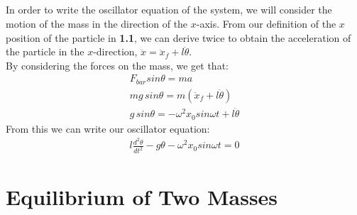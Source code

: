 \documentclass{article}
\begin{document}
\subsection{} %

In order to write the oscillator equation of the system, we will consider the motion of the mass in the direction of the $x$-axis. From our definition of the $x$ position of the particle in \textbf{1.1}, we can derive twice to obtain the acceleration of the particle in the $x$-direction, $\ddot{x} = \ddot{x}_f + l \ddot{\theta}$.\\

\noindent By considering the forces on the mass, we get that:
\begin{align*}
	F_{bar}sin\theta = ma\\
	mg\,sin\theta = m( \ddot{x}_f + l \ddot{\theta})\\
	g\,sin\theta = -\omega^2x_0sin \omega t + l \ddot{\theta}
\end{align*}
From this we can write our oscillator equation:
\begin{align*}
	l \frac{d^2 \theta}{dt^2} - g\theta - \omega^2x_0sin\omega t = 0
\end{align*}

\subsection{} %



\subsection{} %



\subsection{} %

\section{Equilibrium of Two Masses}

\subsection{} %



\subsection{} %
\end{document}

